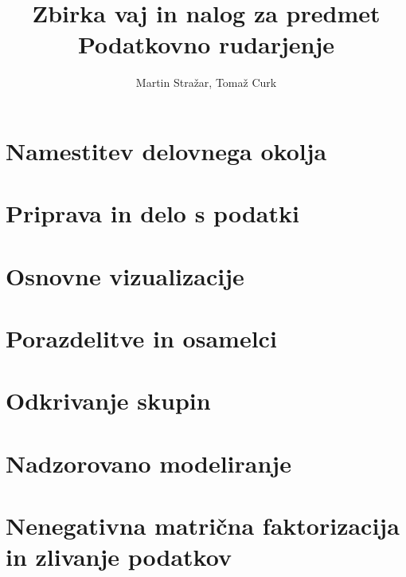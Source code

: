 
\usepackage[slovene]{babel}

\title{Zbirka vaj in nalog za predmet Podatkovno rudarjenje}
\author{Martin Stražar, Tomaž Curk}


\maketitle

\thispagestyle{empty} %
\newpage

\tableofcontents
\newpage

\chapter{Namestitev delovnega okolja}




\chapter{Priprava in delo s podatki}




\chapter{Osnovne vizualizacije}




\chapter{Porazdelitve in osamelci}



%


\chapter{Odkrivanje skupin}



%


\chapter{Nadzorovano modeliranje}



%


\chapter{Nenegativna matrična faktorizacija in zlivanje podatkov}


